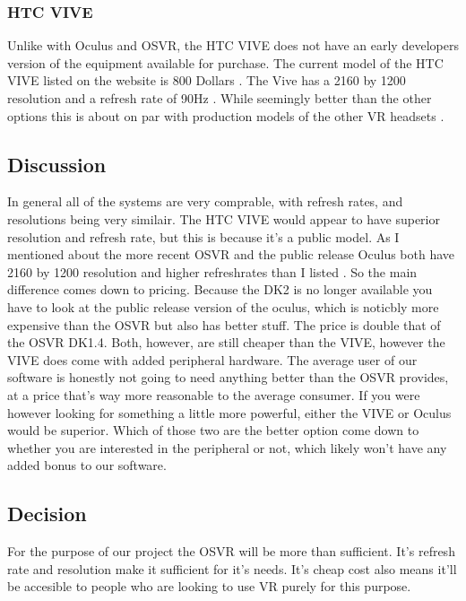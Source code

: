 \documentclass{article}
\begin{document}
\subsubsection{HTC VIVE}
Unlike with Oculus and OSVR, the HTC VIVE does not have an early developers version of the equipment available for purchase.
The current model of the HTC VIVE listed on the website is 800 Dollars \cite{vivehardware}.
The Vive has a 2160 by 1200 resolution and a refresh rate of 90Hz \cite{vivehardware}.
While seemingly better than the other options this is about on par with production models of the other VR headsets \cite{osvrhardware}\cite{oculushardware}.

\subsection{Discussion}
In general all of the systems are very comprable, with refresh rates, and resolutions being very similair.
The HTC VIVE would appear to have superior resolution and refresh rate, but this is because it's a public model.
As I mentioned  about the more recent OSVR and the public release Oculus both have 2160 by 1200 resolution and higher refreshrates than I listed \cite{oculushardware}\cite{osvrhardware}.
So the main difference comes down to pricing.
Because the DK2 is no longer available you have to look at the public release version of the oculus, which is noticbly more expensive than the OSVR but also has better stuff.
The price is double that of the OSVR DK1.4.
Both, however, are still cheaper than the VIVE, however the VIVE does come with added peripheral hardware.
The average user of our software is honestly not going to need anything better than the OSVR provides, at a price that's way more reasonable to the average consumer.
If you were however looking for something a little more powerful, either the VIVE or Oculus would be superior.
Which of those two are the better option come down to whether you are interested in the peripheral or not, which likely won't have any added bonus to our software.

\subsection{Decision}
For the purpose of our project the OSVR will be more than sufficient.
It's refresh rate and resolution make it sufficient for it's needs.
It's cheap cost also means it'll be accesible to people who are looking to use VR purely for this purpose.
\end{document}
